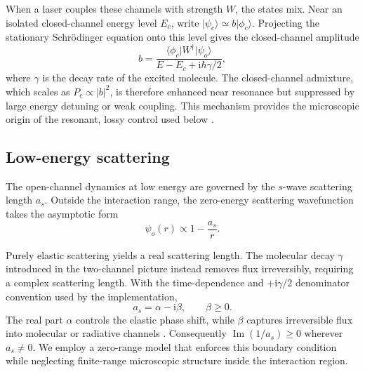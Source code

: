 \documentclass[9pt,a4paper,twocolumn,twoside]{rho-class/rho}
\newcommand{\ii}{\mathrm{i}}
\begin{document}
        When a laser couples these channels with strength $W$, the states mix. Near an isolated closed-channel energy level $E_c$, write $\lvert\psi_c\rangle\simeq b\lvert\phi_c\rangle$. Projecting the stationary Schrödinger equation onto this level gives the closed-channel amplitude
        \begin{equation}\label{eq:closed-channel-amplitude}
            b=\frac{\langle\phi_c\rvert W^\dagger\lvert\psi_o\rangle}
            {E-E_c+\ii\hbar\gamma/2}
            ,
        \end{equation}
        where $\gamma$ is the decay rate of the excited molecule. The closed-channel admixture, which scales as $P_c\propto\lvert b\rvert^2$, is therefore enhanced near resonance but suppressed by large energy detuning or weak coupling. This mechanism provides the microscopic origin of the resonant, lossy control used below \cite{chin2010feshbach}.

    \subsection{Low-energy scattering}

        The open-channel dynamics at low energy are governed by the $s$-wave scattering length $a_s$. Outside the interaction range, the zero-energy scattering wavefunction takes the asymptotic form
        \begin{equation}\label{eq:scattering-length-boundary}
            \psi_o(r)\propto1-\frac{a_s}{r}.
        \end{equation}

        Purely elastic scattering yields a real scattering length. The molecular decay $\gamma$ introduced in the two-channel picture instead removes flux irreversibly, requiring a complex scattering length. With the time-dependence and $+\ii\gamma/2$ denominator convention used by the implementation,
        \begin{equation}\label{eq:complex-scattering-convention}
            a_s=\alpha-\ii\beta,
            \qquad \beta\geq0.
        \end{equation}
        The real part $\alpha$ controls the elastic phase shift, while $\beta$ captures irreversible flux into molecular or radiative channels \cite{bohn1997prospects}. Consequently $\operatorname{Im}(1/a_s)\geq0$ wherever $a_s\ne0$. We employ a zero-range model that enforces this boundary condition while neglecting finite-range microscopic structure inside the interaction region.
\end{document}
